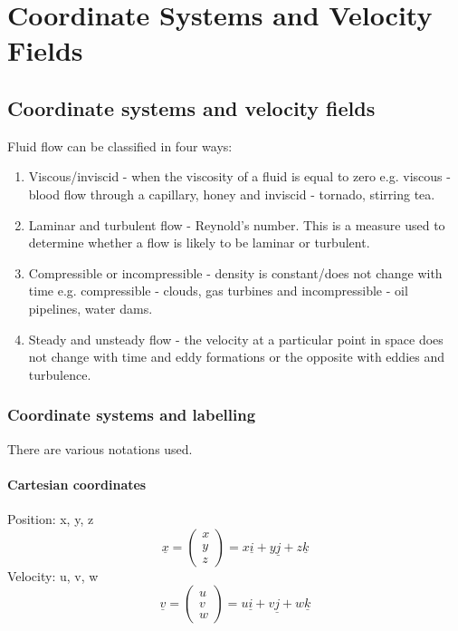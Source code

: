 \chapter{Coordinate Systems and Velocity Fields}
\section{Coordinate systems and velocity fields}
Fluid flow can be classified in four ways:
\begin{enumerate}[noitemsep]
  \item Viscous/inviscid - when the viscosity of a fluid is equal to zero e.g. viscous -  blood flow through a capillary, honey and inviscid - tornado, stirring tea.
  \item Laminar and turbulent flow - Reynold's number. This is a measure used to determine whether a flow is likely to be laminar or turbulent.
  \item Compressible or incompressible - density is constant/does not change with time e.g. compressible - clouds, gas turbines and incompressible - oil pipelines, water dams.
  \item Steady and unsteady flow - the velocity at a particular point in space does not change with time and eddy formations or the opposite with eddies and turbulence.
\end{enumerate}
\subsection{Coordinate systems and labelling}
There are various notations used.
\subsubsection{Cartesian coordinates}
Position: x, y, z
\begin{equation}
  \underline{x} =
  \begin{pmatrix}
    x \\
    y \\
    z
  \end{pmatrix} =
  x\underline{i} + y\underline{j} + z\underline{k}
\end{equation}
Velocity: u, v, w
\begin{equation}
  \underline{v} =
  \begin{pmatrix}
    u \\
    v \\
    w
  \end{pmatrix} =
  u\underline{i} + v\underline{j} + w\underline{k}
\end{equation}
